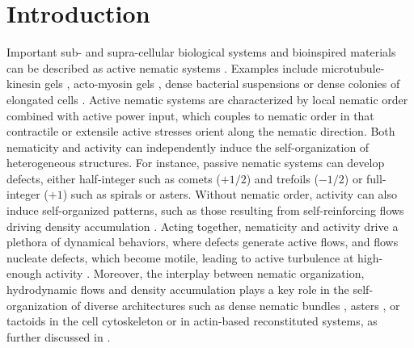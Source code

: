 \documentclass[12pt]{iopart}
\begin{document}
	\maketitle
	
	\section{Introduction} 
	
	Important sub- and supra-cellular biological systems and bioinspired materials can be described as active nematic systems \cite{marchetti2013, doostmohammadi2018}. Examples include microtubule-kinesin gels \cite{decamp2015, lemma2021,li2017,yu2018}, acto-myosin gels \cite{lehtimaki2021, tee2015, tojkander2015,wirshing2017, yolland2019, jalal2019,weirich2017,weirich2019}, dense bacterial suspensions \cite{wioland2013} or dense colonies of elongated cells \cite{duclos2017, guillamat2020,doxzen2013}. Active nematic systems are characterized by local nematic order combined with active power input, which couples to nematic order in that contractile or extensile active stresses orient along the nematic direction. Both nematicity and activity can independently induce the self-organization of heterogeneous structures. For instance, passive nematic systems can develop defects, either half-integer such as comets ($+1/2$) and trefoils ($-1/2$) or full-integer ($+1$) such as spirals or asters. Without nematic order, activity can also induce self-organized patterns, such as those resulting from self-reinforcing flows driving density accumulation  \cite{callan2013,Ruprecht:2015aa,hannezo2015}. Acting together, nematicity and activity drive a plethora of dynamical behaviors, where defects generate active flows, and flows nucleate defects, which become motile, leading to active turbulence at high-enough activity \cite{opathalage2019,gao2017}. Moreover, the interplay between nematic organization, hydrodynamic flows and density accumulation plays a key role in the self-organization of diverse architectures such as dense nematic bundles \cite{lehtimaki2021, tee2015, tojkander2015,wirshing2017, yolland2019, jalal2019}, asters \cite{xia2019}, or tactoids \cite{weirich2017,weirich2019} in the cell cytoskeleton or in actin-based reconstituted systems, as further discussed in \cite{mirza2022}. 
	
\end{document}
